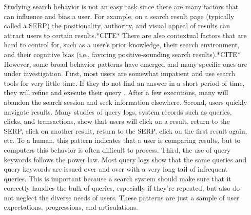 Studying search behavior is not an easy task since there are many factors that can influence and bias a user. For example, on a search result page (typically called a \acrshort{SERP}) the positionality, authority, and visual appeal of results can attract users to certain results.*CITE* There are also contextual factors that are hard to control for, such as a user's prior knowledge, their search environment, and their cognitive bias (i.e., favoring positive-sounding search results).*CITE* However, some broad behavior patterns have emerged and many specific ones are under investigation. First, most users are somewhat impatient and use search tools for very little time. If they do not find an answer in a short period of time, they will refine and execute their query . After a few executions, many will abandon the search session and seek information elsewhere. Second, users quickly navigate results. Many studies of query logs, system records such as queries, clicks, and transactions, show that users will click on a result, return to the SERP, click on another result, return to the SERP, click on the first result again, etc. To a human, this pattern indicates that a user is comparing results, but to computers this behavior is often difficult to process. Third, the use of query keywords follows the power law. Most query logs show that the same queries and query keywords are issued over and over with a very long tail of infrequent queries. This is important because a search system should make sure that it correctly handles the bulk of queries, especially if they're repeated, but also do not neglect the diverse needs of users. These patterns are just a sample of user expectations, progressions, and articulations.

